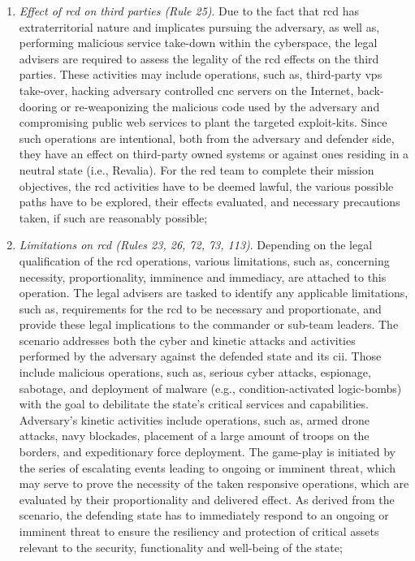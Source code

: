 \begin{enumerate}
    \item \textit{Effect of \gls{rcd} on third parties (Rule 25)}. Due to the fact that \gls{rcd} has extraterritorial nature and implicates pursuing the adversary, as well as, performing malicious service take-down within the cyberspace, the legal advisers are required to assess the legality of the \gls{rcd} effects on the third parties. These activities may include operations, such as, third-party \gls{vps} take-over, hacking adversary controlled \gls{cnc} servers on the Internet, back-dooring or re-weaponizing the malicious code used by the adversary and compromising public web services to plant the targeted exploit-kits. Since such operations are intentional, both from the adversary and defender side, they have an effect on third-party owned systems or against ones residing in a neutral state (i.e., Revalia). For the red team to complete their mission objectives, the \gls{rcd} activities have to be deemed lawful, the various possible paths have to be explored, their effects evaluated, and necessary precautions taken, if such are reasonably possible;
    \item \textit{Limitations on \gls{rcd} (Rules 23, 26, 72, 73, 113)}. Depending on the legal qualification of the \gls{rcd} operations, various limitations, such as, concerning necessity, proportionality, imminence and immediacy, are attached to this operation. The legal advisers are tasked to identify any applicable limitations, such as, requirements for the \gls{rcd} to be necessary and proportionate, and provide these legal implications to the commander or sub-team leaders. The scenario addresses both the cyber and kinetic attacks and activities performed by the adversary against the defended state and its \gls{cii}. Those include malicious operations, such as, serious cyber attacks, espionage, sabotage, and deployment of malware (e.g., condition-activated logic-bombs) with the goal to debilitate the state's critical services and capabilities. Adversary's kinetic activities include operations, such as, armed drone attacks, navy blockades, placement of a large amount of troops on the borders, and expeditionary force deployment. The game-play is initiated by the series of escalating events leading to ongoing or imminent threat, which may serve to prove the necessity of the taken responsive operations, which are evaluated by their proportionality and delivered effect.
    As derived from the scenario, the defending state has to immediately respond to an ongoing or imminent threat to ensure the resiliency and protection of critical assets relevant to the security, functionality and well-being of the state;

\end{enumerate}
